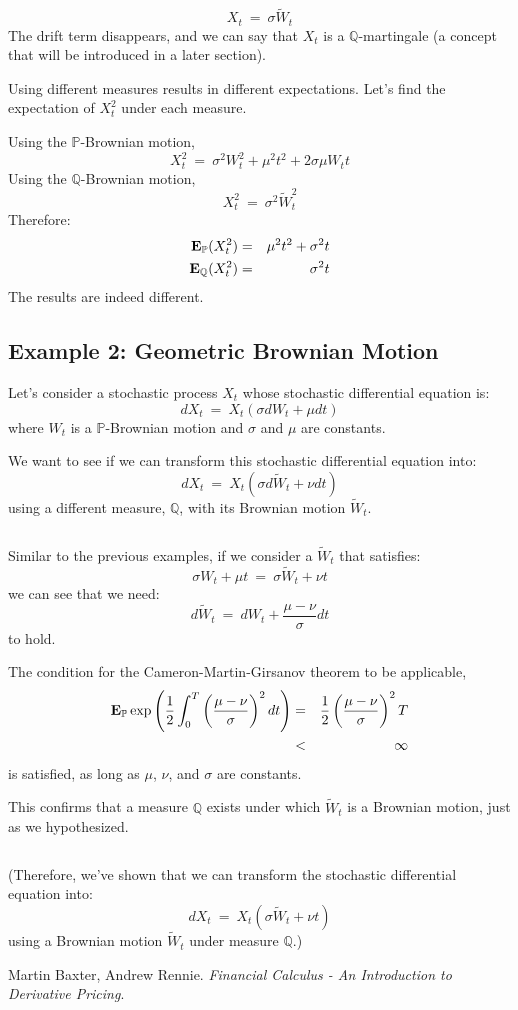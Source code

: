 \documentclass[uplatex,a4j,12pt,dvipdfmx]{jsarticle}
\begin{document}
$$
	X_{t}
	\ = \
	\sigma \tilde{W}_{t}
$$
The drift term disappears, and we can say that $X_{t}$ is a $\mathbb{Q}$-martingale (a concept that will be introduced in a later section).
${}$

Using different measures results in different expectations. Let's find the expectation of $X_{t}^{2}$ under each measure.

Using the $\mathbb{P}$-Brownian motion,
$$
	X^{2}_{t}
	\ = \
	\sigma^{2} W^{2}_{t}
	+
	\mu^{2} t^{2}
	+ 2 \sigma \mu W_{t} t
$$
Using the $\mathbb{Q}$-Brownian motion,
$$
	X^{2}_{t}
	\ = \
	\sigma^{2} \tilde{W}^{2}_{t}
$$
Therefore:
%
\begin{eqnarray*}
	{\bf E}_{\mathbb{P}} (X^{2}_{t})
	&=&
	\mu^{2} t^{2}
	+
	\sigma^{2} t
	\\
	{\bf E}_{\mathbb{Q}} (X^{2}_{t})
	&=&
	\sigma^{2} t
\end{eqnarray*}
%
The results are indeed different.
\subsection{Example 2: Geometric Brownian Motion}

Let's consider a stochastic process $X_{t}$ whose stochastic differential equation is:
$$
	d X_{t}
	\ = \
	X_{t}
	(
	\sigma dW_{t}
	+
	\mu dt
	)
$$
where $W_{t}$ is a $\mathbb{P}$-Brownian motion and $\sigma$ and $\mu$ are constants.

We want to see if we can transform this stochastic differential equation into:
$$
	d X_{t}
	\ = \
	X_{t}
	(
	\sigma d \tilde{W}_{t}
	+
	\nu dt
	)
$$
using a different measure, $\mathbb{Q}$, with its Brownian motion $\tilde{W}_{t}$.

${}$

Similar to the previous examples, if we consider a $\tilde{W}_{t}$ that satisfies:
$$
	\sigma W_{t}
	+
	\mu t
	\ = \
	\sigma \tilde{W}_{t}
	+
	\nu t
$$
we can see that we need:
$$
	d \tilde{W}_{t}
	\ = \
	d W_{t}
	+
	\dfrac{ \mu - \nu }{\sigma}
	dt
$$
to hold.

The condition for the Cameron-Martin-Girsanov theorem to be applicable,
%
\begin{eqnarray*}
	{\bf E}_{\mathbb{P}} \exp \left( \dfrac{1}{2} \int^{T}_{0}
	\left( \dfrac{ \mu - \nu }{\sigma} \right)^{2} dt \right)
	&=&
	\dfrac{1}{2}
	\left( \dfrac{ \mu - \nu }{\sigma} \right)^{2}
	T
	\\ &<&
	\infty
\end{eqnarray*}
%
is satisfied, as long as $\mu$, $\nu$, and $\sigma$ are constants.

This confirms that a measure $\mathbb{Q}$ exists under which $\tilde{W}_{t}$ is a Brownian motion, just as we hypothesized.

${}$

(Therefore, we've shown that we can transform the stochastic differential equation into:
$$
	d X_{t}
	\ = \
	X_{t}
	(
	\sigma \tilde{W}_{t}
	+
	\nu t
	)
$$
using a Brownian motion $\tilde{W}_{t}$ under measure $\mathbb{Q}$.)
\begin{thebibliography}{9}
	Martin Baxter, Andrew Rennie. \textit{Financial Calculus - An Introduction to Derivative Pricing}.
\end{thebibliography}
\end{document}
